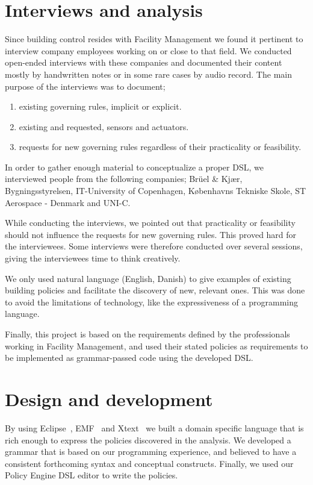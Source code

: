 \documentclass{llncs}
\begin{document}
\section{Interviews and analysis}\label{sec:interviews}
Since building control resides with Facility Management we found it pertinent to interview company employees working on or close to that field. We conducted open-ended interviews with these companies and documented their content mostly by handwritten notes or in some rare cases by audio record. The main purpose of the interviews was to document;

\begin{enumerate}
	\item existing governing rules, implicit or explicit.
	\item existing and requested, sensors and actuators.
	\item requests for new governing rules regardless of their practicality or feasibility.
\end{enumerate}

In order to gather enough material to conceptualize a proper DSL, we interviewed people from the following companies; Br\"{u}el \& Kj\ae r, Bygningsstyrelsen, IT-University of Copenhagen, K\o benhavns Tekniske Skole, ST Aerospace - Denmark and UNI-C.

While conducting the interviews, we pointed out that practicality or feasibility should not influence the requests for new governing rules. This proved hard for the interviewees. Some interviews were therefore conducted over several sessions, giving the interviewees time to think creatively. 

We only used natural language (English, Danish) to give examples of existing building policies and facilitate the discovery of new, relevant ones. This was done to avoid the limitations of technology, like the expressiveness of a programming language.

Finally, this project is based on the requirements defined by the professionals working in Facility Management, and used their stated policies as requirements to be implemented as grammar-passed code using the developed DSL.

\section{Design and development}\label{sec:dsldesign}
By using Eclipse~\cite{eclipse}, EMF~\cite{emf} and Xtext~\cite{xtext} we built a domain specific language that is rich enough to express the policies discovered in the analysis. We developed a grammar that is based on our programming experience, and believed to have a consistent forthcoming syntax and conceptual constructs. Finally, we used our Policy Engine DSL editor to write the policies.
\end{document}
